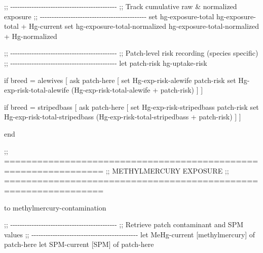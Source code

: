 \documentclass[
]{book}
\newenvironment{Shaded}{\begin{snugshade}}{\end{snugshade}}
\newcommand{\NormalTok}[1]{#1}
\begin{document}
\begin{Shaded}
\begin{Highlighting}[]
\NormalTok{  ;; {-}{-}{-}{-}{-}{-}{-}{-}{-}{-}{-}{-}{-}{-}{-}{-}{-}{-}{-}{-}{-}{-}{-}{-}{-}{-}{-}{-}{-}{-}{-}{-}{-}{-}{-}{-}{-}{-}{-}{-}{-}{-}{-}{-}{-}}
\NormalTok{  ;; Track cumulative raw \& normalized exposure}
\NormalTok{  ;; {-}{-}{-}{-}{-}{-}{-}{-}{-}{-}{-}{-}{-}{-}{-}{-}{-}{-}{-}{-}{-}{-}{-}{-}{-}{-}{-}{-}{-}{-}{-}{-}{-}{-}{-}{-}{-}{-}{-}{-}{-}{-}{-}{-}{-}}
\NormalTok{  set hg{-}exposure{-}total            hg{-}exposure{-}total + Hg{-}current}
\NormalTok{  set hg{-}exposure{-}total{-}normalized hg{-}exposure{-}total{-}normalized + Hg{-}normalized}
  
\NormalTok{  ;; {-}{-}{-}{-}{-}{-}{-}{-}{-}{-}{-}{-}{-}{-}{-}{-}{-}{-}{-}{-}{-}{-}{-}{-}{-}{-}{-}{-}{-}{-}{-}{-}{-}{-}{-}{-}{-}{-}{-}{-}{-}{-}{-}{-}{-}}
\NormalTok{  ;; Patch{-}level risk recording (species specific)}
\NormalTok{  ;; {-}{-}{-}{-}{-}{-}{-}{-}{-}{-}{-}{-}{-}{-}{-}{-}{-}{-}{-}{-}{-}{-}{-}{-}{-}{-}{-}{-}{-}{-}{-}{-}{-}{-}{-}{-}{-}{-}{-}{-}{-}{-}{-}{-}{-}}
\NormalTok{  let patch{-}risk hg{-}uptake{-}risk}
  
\NormalTok{  if breed = alewives [}
\NormalTok{    ask patch{-}here [}
\NormalTok{      set Hg{-}exp{-}risk{-}alewife       patch{-}risk}
\NormalTok{      set Hg{-}exp{-}risk{-}total{-}alewife (Hg{-}exp{-}risk{-}total{-}alewife + patch{-}risk)}
\NormalTok{    ]}
\NormalTok{  ]}
  
\NormalTok{  if breed = stripedbass [}
\NormalTok{    ask patch{-}here [}
\NormalTok{      set Hg{-}exp{-}risk{-}stripedbass       patch{-}risk}
\NormalTok{      set Hg{-}exp{-}risk{-}total{-}stripedbass (Hg{-}exp{-}risk{-}total{-}stripedbass + patch{-}risk)}
\NormalTok{    ]}
\NormalTok{  ]}

\NormalTok{end}


\NormalTok{;; ================================================================}
\NormalTok{;; METHYLMERCURY EXPOSURE}
\NormalTok{;; ================================================================}

\NormalTok{to methylmercury{-}contamination}
  
\NormalTok{  ;; {-}{-}{-}{-}{-}{-}{-}{-}{-}{-}{-}{-}{-}{-}{-}{-}{-}{-}{-}{-}{-}{-}{-}{-}{-}{-}{-}{-}{-}{-}{-}{-}{-}{-}{-}{-}{-}{-}{-}{-}{-}{-}{-}{-}{-}}
\NormalTok{  ;; Retrieve patch contaminant and SPM values}
\NormalTok{  ;; {-}{-}{-}{-}{-}{-}{-}{-}{-}{-}{-}{-}{-}{-}{-}{-}{-}{-}{-}{-}{-}{-}{-}{-}{-}{-}{-}{-}{-}{-}{-}{-}{-}{-}{-}{-}{-}{-}{-}{-}{-}{-}{-}{-}{-}}
\NormalTok{  let MeHg{-}current [methylmercury] of patch{-}here}
\NormalTok{  let SPM{-}current  [SPM] of patch{-}here}


\end{Highlighting}
\end{Shaded}
\end{document}
